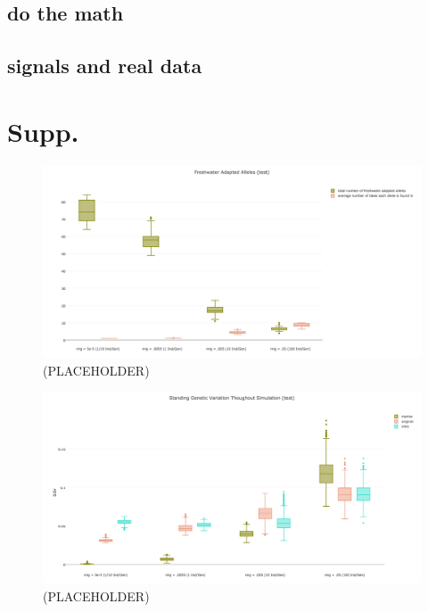 \documentclass{article}
\newcommand{\plr}[1]{\todo[linecolor=blue,backgroundcolor=blue!25,bordercolor=blue]{#1}}
\begin{document}
\subsection*{do the math}

\subsection*{signals and real data}

\clearpage

{}

\section{Supp.}

\begin{figure}
	\begin{center}
  		\includegraphics[width=\linewidth]{plotlyPlots/NumFAA.png}
  		\caption{(PLACEHOLDER)}
		\label{fig:NumFAA}
	\end{center}
\end{figure}

\begin{figure}
	\begin{center}
  		\includegraphics[width=\linewidth]{plotlyPlots/StandingGeneticVariation.png}
  		\caption{(PLACEHOLDER)}
		\label{fig:SGV}
	\end{center}
\end{figure}
\end{document}
